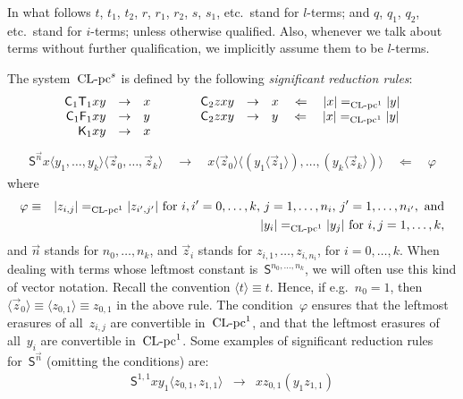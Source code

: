 \documentclass[a4paper,UKenglish]{lipics-v2016}
\newcommand{\Cs}{\mathsf{C}}
\newcommand{\Fs}{\mathsf{F}}
\newcommand{\Ts}{\mathsf{T}}
\newcommand{\Ss}{\mathsf{S}}
\newcommand{\Ks}{\mathsf{K}}
\newcommand{\From}{\ensuremath{\Leftarrow}}
\newcommand{\erase}[1]{\ensuremath{|#1|}}
\newcommand{\la}{\ensuremath{\langle}}
\newcommand{\ra}{\ensuremath{\rangle}}
\newcommand{\CLC}{{\mbox{${\text{\rm CL-pc}^1}$}}}
\newcommand{\sCLC}{{\ensuremath{\text{\rm CL-pc}^1}}}
\newcommand{\CLCs}{{\mbox{${\text{\rm CL-pc}^s}$}}}
\begin{document}
In what follows $t$, $t_1$, $t_2$, $r$, $r_1$, $r_2$, $s$, $s_1$,
etc.~stand for $l$-terms; and $q$, $q_1$, $q_2$, etc.~stand for
$i$-terms; unless otherwise qualified. Also, whenever we talk about
terms without further qualification, we implicitly assume them to be
$l$-terms.

\begin{definition}\label{def_clc_s}
  The system~$\CLCs$ is defined by the following \emph{significant
    reduction rules}:
  \[
  \begin{array}{rclcrcl}
    \Cs_1 \Ts_1 x y &\to& x &\quad\quad& \Cs_2 z x y &\to& x \quad\From\quad \erase{x} =_{\sCLC} \erase{y} \\
    \Cs_1 \Fs_1 x y &\to& y &\quad\quad& \Cs_2 z x y &\to& y \quad\From\quad \erase{x} =_{\sCLC} \erase{y} \\
    \Ks_1 x y &\to& x &\quad& &&
  \end{array}
  \]
  \[
  \begin{array}{l}
    \Ss^{\vec{n}} x \la y_1,\ldots,y_{k}\ra \la \vec{z}_0, \ldots, \vec{z}_k
    \ra\quad
    \to
    \quad
    x \la \vec{z}_0 \ra \la (y_1 \la \vec{z}_1 \ra),
    \ldots, (y_{k} \la \vec{z}_{k} \ra) \ra
    \quad\From \quad \varphi
  \end{array}
  \]
  where
  \begin{eqnarray*}
    \varphi &\equiv& \erase{z_{i,j}} =_{\sCLC}
    \erase{z_{i',j'}} \text{ for } i,i'=0,\ldots,k,\,
    j=1,\ldots,n_i,\, j'=1,\ldots,n_{i'}, \text{ and} \\ && \erase{y_i} =_{\sCLC}
    \erase{y_j} \text{ for } i,j=1,\ldots,k,
  \end{eqnarray*}
  and $\vec{n}$ stands for $n_0,\ldots,n_{k}$, and $\vec{z}_i$ stands
  for $z_{i,1},\ldots,z_{i,n_i}$, for $i=0,\ldots,k$. When dealing
  with terms whose leftmost constant is~$\Ss^{n_0,\ldots,n_k}$, we
  will often use this kind of vector notation. Recall the convention
  $\la t \ra \equiv t$. Hence, if e.g.~$n_0 = 1$, then
  $\la \vec{z}_0 \ra \equiv \la z_{0,1} \ra \equiv z_{0,1}$ in the
  above rule. The condition~$\varphi$ ensures that the leftmost
  erasures of all~$z_{i,j}$ are convertible in~$\CLC$, and that the
  leftmost erasures of all~$y_i$ are convertible in~$\CLC$. Some
  examples of significant reduction rules for~$\Ss^{\vec{n}}$
  (omitting the conditions) are:
  \[
    \begin{array}{rcl}
      \Ss^{1,1} x y_1 \la z_{0,1}, z_{1,1}\ra &\to& x z_{0,1} (y_1
                                                    z_{1,1}) \\

\end{array}\]
\end{definition}
\end{document}

